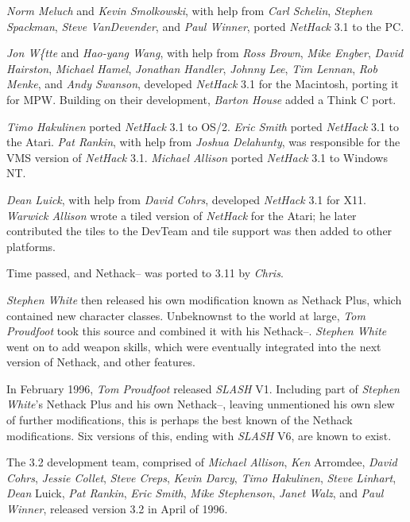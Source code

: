 {\it Norm Meluch\/} and {\it Kevin Smolkowski}, with help from
{\it Carl Schelin}, {\it Stephen Spackman}, {\it Steve VanDevender},
and {\it Paul Winner}, ported {\it NetHack\/} 3.1 to the PC.

{\it Jon W\{tte\/} and {\it Hao-yang Wang}, with help from {\it Ross Brown},
{\it Mike Engber}, {\it David Hairston}, {\it Michael Hamel},
{\it Jonathan Handler}, {\it Johnny Lee}, {\it Tim Lennan}, {\it Rob Menke},
and {\it Andy Swanson}, developed {\it NetHack\/} 3.1 for the Macintosh,
porting it for MPW.  Building on their development, {\it Barton House\/}
added a Think C port.

{\it Timo Hakulinen\/} ported {\it NetHack\/} 3.1 to OS/2.  {\it Eric Smith\/}
ported {\it NetHack\/} 3.1 to the Atari.  {\it Pat Rankin}, with help from
{\it Joshua Delahunty}, was responsible for the VMS version of {\it NetHack\/} 3.1.
{\it Michael Allison\/} ported {\it NetHack\/} 3.1 to Windows NT.

{\it Dean Luick}, with help from {\it David Cohrs}, developed {\it NetHack\/}
3.1 for X11.
{\it Warwick Allison\/} wrote a tiled version of {\it NetHack\/} for the Atari;
he later contributed the tiles to the DevTeam and tile support was
then added to other platforms.

Time passed,  and Nethack-- was ported to 3.11 by {\it Chris}.

{\it Stephen White\/} then released his own modification known as
Nethack Plus,  which contained new character classes.  Unbeknownst
to the world at large,  {\it Tom Proudfoot\/} took this source and
combined it with his Nethack--.  {\it Stephen White\/} went on to add
weapon skills,  which were eventually integrated into the next version
of Nethack,  and other features.

In February 1996,  {\it Tom Proudfoot\/} released {\it SLASH\/} V1.  Including
part of {\it Stephen White\/}'s Nethack Plus and his own Nethack--,  leaving
unmentioned his own slew of further modifications,  this is perhaps
the best known of the Nethack modifications.  Six versions of this,  ending
with {\it SLASH\/} V6,  are known to exist.

The 3.2 development team, comprised of {\it Michael Allison}, {\it Ken}
Arromdee, {\it David Cohrs}, {\it Jessie Collet}, {\it Steve Creps},
{\it Kevin Darcy}, {\it Timo Hakulinen}, {\it Steve Linhart}, {\it Dean}
Luick, {\it Pat Rankin}, {\it Eric Smith}, {\it Mike Stephenson},
{\it Janet Walz}, and {\it Paul Winner}, released version 3.2 in April of
1996.

